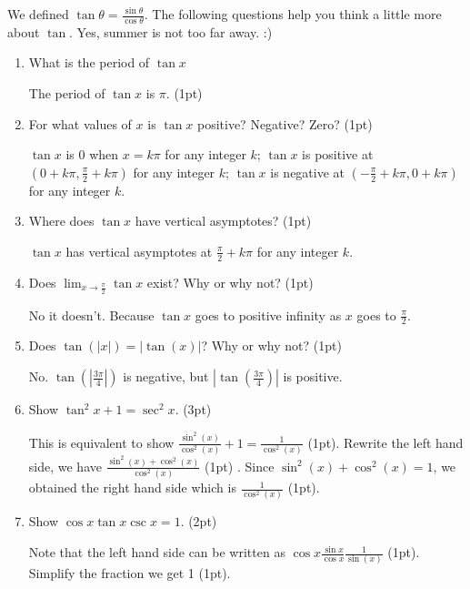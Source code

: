 \documentclass[12pt,twoside]{article}
\newcommand{\dsst}{\displaystyle}
\begin{document}
We defined $\tan \theta=\frac{\sin\theta}{\cos\theta}$. The following questions help you think a little more about $\tan$. Yes, summer is not too far away. :) 

\begin{enumerate}
      \item What is the period of $\tan x$
      
      The period of $\tan x$ is $\pi$. (1pt)
      \item For what values of $x$ is $\tan x$ positive?  Negative?  Zero? (1pt)
     
      $\tan x$ is 0 when $x = k\pi$ for any integer $k$; $\tan x$ is positive at $(0 + k\pi, \frac{\pi}{2} + k\pi)$ for any integer $k$; $\tan x$ is negative at $(-\frac{\pi}{2} + k \pi, 0 + k \pi)$ for any integer $k$. 
       \item Where does $\tan x$ have vertical asymptotes? (1pt)
       
       $\tan x$ has vertical asymptotes at $\frac{\pi}{2} + k \pi$ for any integer $k$. 
       
      \item Does $\dsst\lim_{x\to\frac{\pi}{2}} \tan x$ exist?  Why or why not? (1pt)
      
     No it doesn't. Because $\tan x$ goes to positive infinity as $x$ goes to $\frac{\pi}{2}$. 
      \item Does $\tan (|x|) = | \tan(x) |$? Why or why not? (1pt)
      
      No. $\tan (|\frac{3\pi}{4}|)$ is negative, but $|\tan (\frac{3\pi}{4})|$ is positive. 
      \item Show $\tan^2 x + 1 = \sec^2 x$. (3pt)
      
      This is equivalent to show $\frac{\sin^2(x)}{\cos^2(x)} + 1 = \frac{1}{\cos^2(x)}$ (1pt). Rewrite the left hand side, we have $\frac{\sin^2(x)+\cos^2(x)}{\cos^2(x)} $ (1pt) . Since $\sin^2(x)+\cos^2(x) = 1$, we obtained the right hand side which is $\frac{1}{\cos^2(x)}$ (1pt). 
      
      \item Show $\cos x \tan x \csc x = 1$.  (2pt)
      
      Note that the left hand side can be written as $\cos x \frac{\sin x}{\cos x} \frac{1}{\sin(x)}$ (1pt). Simplify the fraction we get 1 (1pt). 
\end{enumerate}
\end{document}
